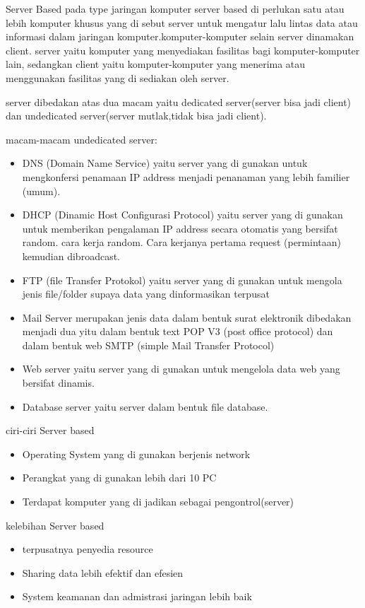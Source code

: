 Server Based
pada type jaringan komputer server based di perlukan satu atau lebih komputer khusus yang di sebut server untuk mengatur lalu lintas data atau informasi dalam jaringan komputer.komputer-komputer selain server dinamakan client. server yaitu komputer yang menyediakan fasilitas bagi komputer-komputer lain, sedangkan client yaitu komputer-komputer yang menerima atau menggunakan fasilitas yang di sediakan oleh server.

server dibedakan atas dua macam yaitu dedicated server(server bisa jadi client) dan undedicated server(server mutlak,tidak bisa jadi client).

macam-macam undedicated server:
\begin{itemize}
  \item DNS (Domain Name Service) yaitu server yang di gunakan untuk mengkonfersi penamaan IP address menjadi penanaman yang lebih familier (umum).
  \item DHCP (Dinamic Host Configurasi Protocol) yaitu server yang di gunakan untuk memberikan pengalaman IP address secara otomatis yang bersifat random. cara kerja random. Cara kerjanya pertama request (permintaan) kemudian dibroadcast.
  \item  FTP (file Transfer Protokol) yaitu server yang di gunakan untuk mengola jenis file/folder supaya data yang dinformasikan terpusat
  \item Mail Server merupakan jenis data dalam bentuk surat elektronik dibedakan menjadi dua yitu dalam bentuk text POP V3 (post office protocol) dan dalam bentuk web SMTP (simple Mail Transfer Protocol)
  \item Web server yaitu server yang di gunakan untuk mengelola data web yang bersifat dinamis.
  \item Database server yaitu server dalam bentuk file database.
\end{itemize}

ciri-ciri Server based
\begin{itemize}
  \item Operating System yang di gunakan berjenis network
  \item Perangkat yang di gunakan lebih dari 10 PC
  \item Terdapat komputer yang di jadikan sebagai pengontrol(server)\cite{wahyono2007building}
\end{itemize}

kelebihan Server based
\begin{itemize}
  \item terpusatnya penyedia resource
  \item Sharing data lebih efektif dan efesien
  \item System keamanan dan admistrasi jaringan lebih baik
\end{itemize}

